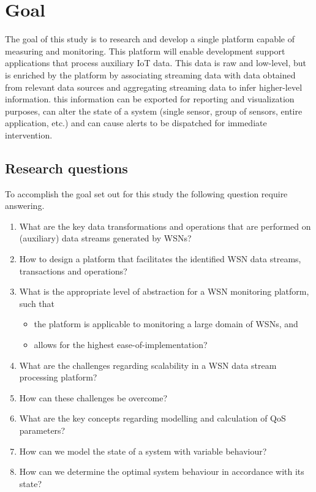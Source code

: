 \section{Goal}
The goal of this study is to research and develop a single platform capable of measuring and monitoring. This platform will enable development support applications that process auxiliary IoT data. This data is raw and low-level, but is enriched by the platform by associating streaming data with data obtained from relevant data sources and aggregating streaming data to infer higher-level information. this information can be exported for reporting and visualization purposes, can alter the state of a system (single sensor, group of sensors, entire application, etc.) and can cause alerts to be dispatched for immediate intervention.

\subsection{Research questions}
To accomplish the goal set out for this study the following question require answering.
\begin{enumerate}[leftmargin=24pt, label=\small RQ\arabic*]
\nospace
\item What are the key data transformations and operations that are performed on (auxiliary) data streams generated by WSNs?
\item How to design a platform that facilitates the identified WSN data streams, transactions and operations?
\item What is the appropriate level of abstraction for a WSN monitoring platform, such that
\begin{itemize}
\nospace
\item the platform is applicable to monitoring a large domain of WSNs, and
\item allows for the highest ease-of-implementation?
\end{itemize}
\item What are the challenges regarding scalability in a WSN data stream processing platform?
\item How can these challenges be overcome?
\item What are the key concepts regarding modelling and calculation of QoS parameters?
\item How can we model the state of a system with variable behaviour?
\item How can we determine the optimal system behaviour in accordance with its state?
\end{enumerate}


